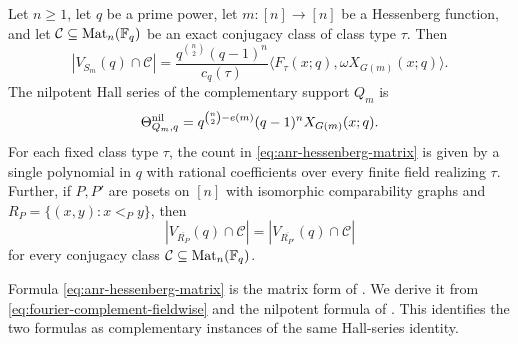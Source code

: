 \begin{corollary}
\label{cor:anr-hessenberg-matrix}\label{cor:combined-comparability}
\label{cor:uio-full-incidence}
Let $n\geq1$, let $q$ be a prime power, let $m:[n]\to[n]$ be a Hessenberg
function, and let $\mathcal C\subseteq\operatorname{Mat}_n(\mathbb F_q)$ be an exact {conjugacy class} of class type $\tau$. Then
\begin{equation}
 |V_{S_m}(q)\cap\mathcal C|=
 \frac{q^{\binom n2}(q-1)^n}{c_q(\tau)}
       \langle F_\tau(x;q),\omega X_{G(m)}(x;q)\rangle.
 \label{eq:anr-hessenberg-matrix}
\end{equation}
{The nilpotent Hall series of the complementary support $Q_m$ is}
\[
 \Theta^{\mathrm{nil}}_{Q_m,q}=q^{\binom n2-e(m)}(q-1)^nX_{G(m)}(x;q).
\]
{For each fixed class type $\tau$, the count in
\eqref{eq:anr-hessenberg-matrix} is given by a single polynomial in $q$
with rational coefficients over every finite field realizing $\tau$.}
{Further, if $P,P'$ are posets on $[n]$ with
isomorphic comparability graphs and}
$R_P=\{(x,y):x<_Py\}$, then
\begin{equation}
 |V_{\overline{R_P}}(q)\cap\mathcal C|
 =|V_{\overline{R_{P'}}}(q)\cap\mathcal C|
 \label{eq:dense-comparability}
\end{equation}
{for every conjugacy class
$\mathcal C\subseteq\operatorname{Mat}_n(\mathbb F_q)$.}
\end{corollary}

Formula \eqref{eq:anr-hessenberg-matrix} is the matrix form of
\textcite[Theorem~1.1]{ANRHessenberg}. We derive it from
\eqref{eq:fourier-complement-fieldwise} and the nilpotent formula of
\textcite[Theorem~1.5]{BMRSOrbital}. This identifies the two formulas
as complementary instances of the same Hall-series identity.


